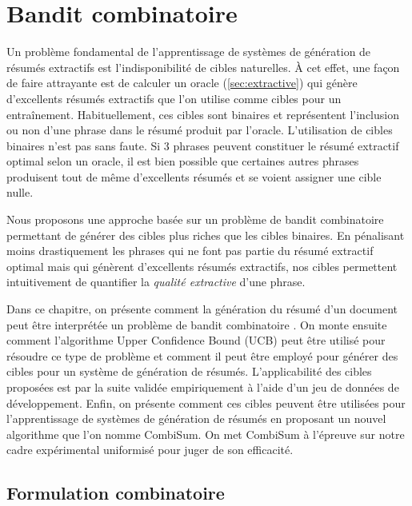 \chapter{Bandit combinatoire}
\label{chap:bandit_combi}                   %

Un problème fondamental de l'apprentissage de 
systèmes de génération de résumés extractifs est l'indisponibilité
de cibles naturelles.
À cet effet, une façon de faire attrayante est de 
calculer un oracle (\ref{sec:extractive}) 
qui génère d'excellents résumés extractifs que 
l'on utilise comme cibles pour un entraînement.
Habituellement, ces cibles sont binaires et représentent 
l'inclusion ou non d'une phrase dans le résumé produit 
par l'oracle. 
L'utilisation de cibles binaires n'est pas sans faute.
Si 3 phrases peuvent constituer le résumé extractif optimal 
selon un oracle, il est bien possible que certaines 
autres phrases produisent tout de même d'excellents résumés 
et se voient assigner une cible nulle.

Nous proposons une approche basée sur un problème 
de bandit combinatoire permettant de générer des cibles 
plus riches que les cibles binaires.
En pénalisant moins drastiquement les phrases qui ne font 
pas partie du résumé extractif optimal mais qui 
génèrent d'excellents résumés extractifs, nos cibles 
permettent intuitivement de quantifier la \textit{qualité 
extractive} d'une phrase.

Dans ce chapitre, on présente comment la génération du résumé d'un document
peut être interprétée un problème de bandit combinatoire \citep{CESABIANCHI20121404}.
On monte ensuite comment l'algorithme Upper Confidence Bound (UCB) \citep{ucb} peut être utilisé 
pour résoudre ce type de problème et comment il peut être employé pour 
générer des cibles pour un système de génération de résumés.
L'applicabilité des cibles proposées est par la suite validée empiriquement 
à l'aide d'un jeu de données de développement.
Enfin, on présente comment ces cibles peuvent être utilisées pour 
l'apprentissage de systèmes de génération de résumés en proposant 
un nouvel algorithme que l'on nomme CombiSum.
On met CombiSum à l'épreuve sur notre cadre expérimental 
uniformisé pour juger de son efficacité.

\section{Formulation combinatoire}
\label{section:formulation_combi}

